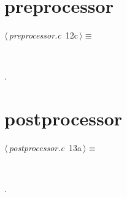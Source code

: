 \documentclass[a4paper,11pt]{article}
\begin{document}
\section{preprocessor}
\begin{flushleft} \small
\begin{minipage}{\linewidth}\label{scrap15}\raggedright\small
{} $\langle\,${\itshape preprocessor.c}\nobreak\ {\footnotesize {12c}}$\,\rangle\equiv$
\vspace{-1ex}
\begin{list}{}{} \item
\mbox{}\verb@@\\
\mbox{}\verb@@{\NWsep}
\end{list}
\vspace{-1.5ex}
\footnotesize
\begin{list}{}{\setlength{\itemsep}{-\parsep}\setlength{\itemindent}{-\leftmargin}}
\item {\NWtxtMacroNoRef}.

\item{}
\end{list}
\end{minipage}\vspace{4ex}
\end{flushleft}
\section{postprocessor}
\begin{flushleft} \small
\begin{minipage}{\linewidth}\label{scrap16}\raggedright\small
{} $\langle\,${\itshape postprocessor.c}\nobreak\ {\footnotesize {13a}}$\,\rangle\equiv$
\vspace{-1ex}
\begin{list}{}{} \item
\mbox{}\verb@@\\
\mbox{}\verb@@{\NWsep}
\end{list}
\vspace{-1.5ex}
\footnotesize
\begin{list}{}{\setlength{\itemsep}{-\parsep}\setlength{\itemindent}{-\leftmargin}}
\item {\NWtxtMacroNoRef}.

\item{}
\end{list}
\end{minipage}\vspace{4ex}
\end{flushleft}
\end{document}

